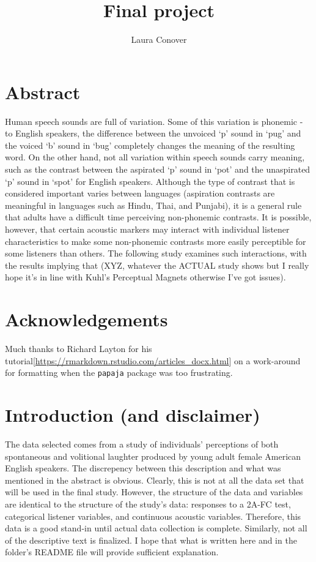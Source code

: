 \documentclass[
]{article}
\title{Final project}
\author{Laura Conover}
\date{}
\begin{document}
\maketitle

\hypertarget{abstract}{%
\section{Abstract}\label{abstract}}

Human speech sounds are full of variation. Some of this variation is
phonemic - to English speakers, the difference between the unvoiced `p'
sound in `pug' and the voiced `b' sound in `bug' completely changes the
meaning of the resulting word. On the other hand, not all variation
within speech sounds carry meaning, such as the contrast between the
aspirated `p' sound in `pot' and the unaspirated `p' sound in `spot' for
English speakers. Although the type of contrast that is considered
important varies between languages (aspiration contrasts are meaningful
in languages such as Hindu, Thai, and Punjabi), it is a general rule
that adults have a difficult time perceiving non-phonemic contrasts. It
is possible, however, that certain acoustic markers may interact with
individual listener characteristics to make some non-phonemic contrasts
more easily perceptible for some listeners than others. The following
study examines such interactions, with the results implying that (XYZ,
whatever the ACTUAL study shows but I really hope it's in line with
Kuhl's Perceptual Magnets otherwise I've got issues).

\hypertarget{acknowledgements}{%
\section{Acknowledgements}\label{acknowledgements}}

Much thanks to Richard Layton for his
tutorial{[}\url{https://rmarkdown.rstudio.com/articles_docx.html}{]} on
a work-around for formatting when the \texttt{papaja} package was too
frustrating.

\hypertarget{introduction-and-disclaimer}{%
\section{Introduction (and
disclaimer)}\label{introduction-and-disclaimer}}

The data selected comes from a study of individuals' perceptions of both
spontaneous and volitional laughter produced by young adult female
American English speakers. The discrepency between this description and
what was mentioned in the abstract is obvious. Clearly, this is not at
all the data set that will be used in the final study. However, the
structure of the data and variables are identical to the structure of
the study's data: responses to a 2A-FC test, categorical listener
variables, and continuous acoustic variables. Therefore, this data is a
good stand-in until actual data collection is complete. Similarly, not
all of the descriptive text is finalized. I hope that what is written
here and in the folder's README file will provide sufficient
explanation.
\end{document}
